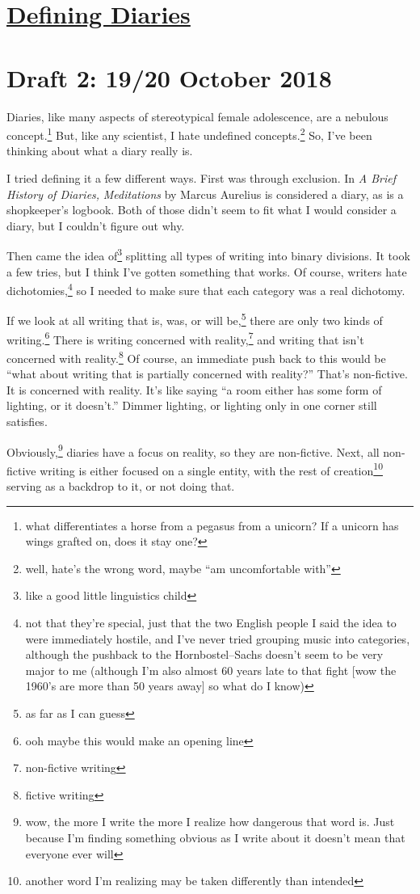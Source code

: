 \documentclass[12pt]{article}[titlepage]
\newcommand{\say}[1]{``#1''}
\newcommand{\1}{\={a}}
\newcommand{\2}{\={e}}
\newcommand{\3}{\={\i}}
\newcommand{\4}{\=o}
\newcommand{\5}{\=u}
\newcommand{\6}{\={A}}
\renewcommand{\,}{\textsuperscript{,}}
\begin{document}
\doublespacing
\section{\href{defining-diaries.html}{Defining Diaries}}
\section{Draft 2: 19/20 October 2018}
Diaries, like many aspects of stereotypical female adolescence, are a nebulous concept.\footnote{what differentiates a horse from a pegasus from a unicorn? If a unicorn has wings grafted on, does it stay one?}
But, like any scientist, I hate undefined concepts.\footnote{well, hate's the wrong word, maybe \say{am uncomfortable with}}
So, I've been thinking about what a diary really is.

I tried defining it a few different ways.
First was through exclusion.
In \textit{A Brief History of Diaries,} \textit{Meditations} by Marcus Aurelius is considered a diary, as is a shopkeeper's logbook.
Both of those didn't seem to fit what I would consider a diary, but I couldn't figure out why.

Then came the idea of\footnote{like a good little linguistics child} splitting all types of writing into binary divisions.
It took a few tries, but I think I've gotten something that works.
Of course, writers hate dichotomies,\footnote{not that they're special, just that the two English people I said the idea to were immediately hostile, and I've never tried grouping music into categories, although the pushback to the Hornbostel--Sachs doesn't seem to be very major to me (although I'm also almost 60 years late to that fight [wow the 1960's are more than 50 years away] so what do I know)} so I needed to make sure that each category was a real dichotomy.

If we look at all writing that is, was, or will be,\footnote{as far as I can guess} there are only two kinds of writing.\footnote{ooh maybe this would make an opening line}
There is writing concerned with reality,\footnote{non-fictive writing} and writing that isn't concerned with reality.\footnote{fictive writing}
Of course, an immediate push back to this would be \say{what about writing that is partially concerned with reality?}
That's non-fictive.
It is concerned with reality.
It's like saying \say{a room either has some form of lighting, or it doesn't.}
Dimmer lighting, or lighting only in one corner still satisfies.

Obviously,\footnote{wow, the more I write the more I realize how dangerous that word is. Just because I'm finding something obvious as I write about it doesn't mean that everyone ever will} diaries have a focus on reality, so they are non-fictive.
Next, all non-fictive writing is either focused on a single entity, with the rest of creation\footnote{another word I'm realizing may be taken differently than intended} serving as a backdrop to it, or not doing that.
\end{document}
